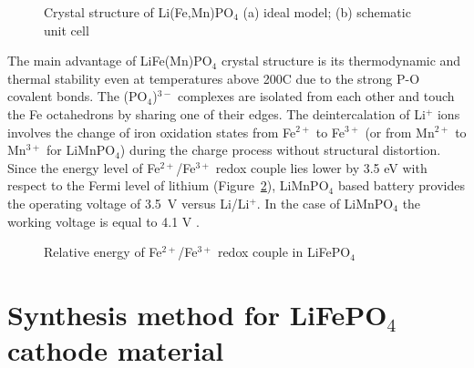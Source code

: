 \begin{figure}[ht]
\begin{minipage}[h]{0.5\linewidth}
\end{minipage}
\caption{Crystal structure of Li(Fe,Mn)PO$_4$ (a) ideal model; (b) schematic unit cell}
\label{ris:str}
\end{figure}

The main advantage of LiFe(Mn)PO$_4$ crystal structure is its thermodynamic and thermal stability even at temperatures above 200\textdegree C due to the strong P-O covalent bonds. The (PO$_4$)$^{3-}$ complexes are isolated from each other and touch the Fe octahedrons by sharing one of their edges. The deintercalation of Li$^+$ ions involves the change of iron oxidation states from Fe$^{2+}$ to Fe$^{3+}$ (or from Mn$^{2+}$ to Mn$^{3+}$ for LiMnPO$_4$) during the charge process without structural distortion. Since the energy level of Fe$^{2+}$/Fe$^{3+}$ redox couple lies lower by 3.5 eV with respect to the Fermi level of lithium (Figure~\ref{ris:3.5}), LiMnPO$_4$ based battery provides the operating voltage of 3.5~V versus Li/Li$^+$. In the case of LiMnPO$_4$ the working voltage is equal to 4.1 V \cite{zhou2017comparative}. 

\begin{figure}[ht]
\caption{Relative energy of Fe$^{2+}$/Fe$^{3+}$ redox couple in LiFePO$_4$ \cite{padhi1997effect}}
\label{ris:3.5}
\end{figure}

\section{Synthesis method for LiFePO$_4$ cathode material}


